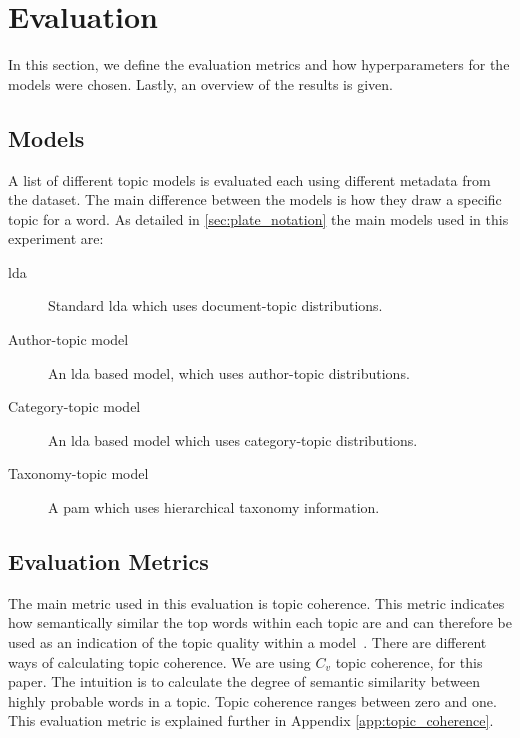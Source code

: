 \section{Evaluation}\label{sec:experiment}
In this section, we define the evaluation metrics and how hyperparameters for the models were chosen.
Lastly, an overview of the results is given.

\subsection{Models}\label{sec:experiment_models}
A list of different topic models is evaluated each using different metadata from the dataset.
The main difference between the models is how they draw a specific topic for a word.
As detailed in \autoref{sec:plate_notation} the main models used in this experiment are:
\begin{description}
	\item[\Acrlong{lda}] Standard \gls{lda} which uses document-topic distributions.
	\item[Author-topic model]\cite{author_topic_2012} An \gls{lda} based model, which uses author-topic distributions.
	\item[Category-topic model] An \gls{lda} based model which uses category-topic distributions.
	\item[Taxonomy-topic model] A \acrlong{pam} which uses hierarchical taxonomy information.
\end{description}

\subsection{Evaluation Metrics}\label{sec:experiment_metrics}
The main metric used in this evaluation is topic coherence\cite{Syed2017coherence}.
This metric indicates how semantically similar the top words within each topic are and can therefore be used as an indication of the topic quality within a model~\cite{topic_coherence_2015}.
There are different ways of calculating topic coherence.
We are using $C_v$ topic coherence, for this paper.
The intuition is to calculate the degree of semantic similarity between highly probable words in a topic.
Topic coherence ranges between zero and one.
This evaluation metric is explained further in Appendix \autoref{app:topic_coherence}.

